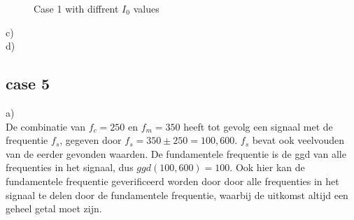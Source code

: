 \documentclass{article}
\begin{document}
\begin{figure}[h]
  \centering
  \caption{Case 1 with diffrent $I_0$ values}
  \label{fig:case1b}
\end{figure}


c)\\
d)\\
\newpage 
\subsection{case 5}
a)\\
De combinatie van $f_c = 250$ en $f_m = 350$ heeft tot gevolg een signaal met de frequentie $f_s$, gegeven door $f_s = 350 \pm 250 = {100, 600}$. $f_s$ bevat ook veelvouden van de eerder gevonden waarden. De fundamentele frequentie is de ggd van alle frequenties in het signaal, dus $ggd(100, 600) = 100$. Ook hier kan de fundamentele frequentie geverificeerd worden door door alle frequenties in het signaal te delen door de fundamentele frequentie, waarbij de uitkomst altijd een geheel getal moet zijn.
\end{document}
